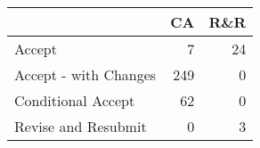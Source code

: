 \begin{tabular}{l rr}
  \toprule
               & \multicolumn{1}{l}{  CA} & \multicolumn{1}{l}{ R\&R} \\ 
   \midrule
Accept                &   7 &    24 \\ 
  Accept - with Changes & 249 &     0 \\ 
  Conditional Accept    &  62 &     0 \\ 
  Revise and Resubmit   &   0 &     3 \\ 
   \bottomrule
\end{tabular}
